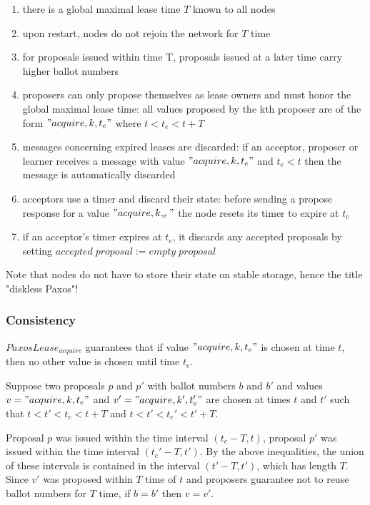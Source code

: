 \documentclass[12pt]{amsart}
\begin{document}
\begin{enumerate}
\item there is a global maximal lease time $T$ known to all nodes

\item upon restart, nodes do not rejoin the network for $T$ time

\item for proposals issued within time T, proposals issued at a later time carry higher ballot numbers


\item proposers can only propose themselves as lease owners and must honor the global maximal lease time: all values proposed by the kth proposer are of the form $"acquire, k, t_e"$ where $t < t_e < t + T$

\item messages concerning expired leases are discarded: if an acceptor, proposer or learner receives a message with value $"acquire, k, t_e"$ and $t_e < t$ then the message is automatically discarded

\item acceptors use a timer and discard their state: before sending a propose response for a value $"acquire, k, _e"$ the node resets its timer to expire at $t_e$

\item if an acceptor's timer expires at $t_e$, it discards any accepted proposals by setting $accepted \; proposal := empty \; proposal$

\end{enumerate}

Note that nodes do not have to store their state on stable storage, hence the title "diskless Paxos"!

\subsubsection{ Consistency } $PaxosLease_{acquire}$ guarantees that if value $"acquire, k, t_e"$ is chosen at time $t$, then no other value is chosen until time $t_e$.

Suppose two proposals $p$ and $p'$ with ballot numbers $b$ and $b'$ and values $v = "acquire, k, t_e"$ and $v' = "acquire, k', t_e'"$ are chosen at times $t$ and $t'$ such that $t < t' < t_e < t + T$ and $t < t' < t_e' < t' + T$.

Proposal $p$ was issued within the time interval $(t_e - T, t)$, proposal $p'$ was issued within the time interval $(t_e' - T, t')$. By the above inequalities, the union of these intervals is contained in the interval $(t' - T, t')$, which has length $T$. Since $v'$ was proposed within $T$ time of $t$ and proposers guarantee not to reuse ballot numbers for $T$ time, if $b = b'$ then $v = v'$.
\end{document}

